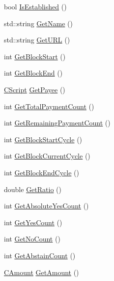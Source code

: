 \begin{DoxyCompactItemize}
\item 
bool \hyperlink{class_c_budget_proposal_a0f4231aa216c99a6a3ad2b6bf31d8bfe}{Is\+Established} ()
\item 
std\+::string \hyperlink{class_c_budget_proposal_a7f3bf6d86e4f4af03a45aa1c6d177af1}{Get\+Name} ()
\item 
std\+::string \hyperlink{class_c_budget_proposal_a4bddce62840e993e7351e68bfafca05d}{Get\+U\+R\+L} ()
\item 
int \hyperlink{class_c_budget_proposal_a711280cfc20e1d1a76a2b8c59dfe26ad}{Get\+Block\+Start} ()
\item 
int \hyperlink{class_c_budget_proposal_ad3e5e60c9fe53d7aef3314634eae54d7}{Get\+Block\+End} ()
\item 
\hyperlink{class_c_script}{C\+Script} \hyperlink{class_c_budget_proposal_a5489ea6b1dd54e25c2a0a52ef67e71a1}{Get\+Payee} ()
\item 
int \hyperlink{class_c_budget_proposal_a54cc431d667a7dfa1e010d6ff17a40c4}{Get\+Total\+Payment\+Count} ()
\item 
int \hyperlink{class_c_budget_proposal_a1fef390cf24f7f110c375ab6e7d01f50}{Get\+Remaining\+Payment\+Count} ()
\item 
int \hyperlink{class_c_budget_proposal_a66de6699a9cc9b084eecf014a168bab8}{Get\+Block\+Start\+Cycle} ()
\item 
int \hyperlink{class_c_budget_proposal_a33ad377cb08046ac197041fb6a06df6e}{Get\+Block\+Current\+Cycle} ()
\item 
int \hyperlink{class_c_budget_proposal_afe85ba7619fe2bf636e063550769a006}{Get\+Block\+End\+Cycle} ()
\item 
double \hyperlink{class_c_budget_proposal_aef844b5ab211003e6b93bef75a20da6e}{Get\+Ratio} ()
\item 
int \hyperlink{class_c_budget_proposal_ac3533cb49bad2a16caff3a1f5a5a7642}{Get\+Absolute\+Yes\+Count} ()
\item 
int \hyperlink{class_c_budget_proposal_adfb1010987096898eb4e820440877442}{Get\+Yes\+Count} ()
\item 
int \hyperlink{class_c_budget_proposal_abff824751942908b6babccd221911399}{Get\+No\+Count} ()
\item 
int \hyperlink{class_c_budget_proposal_a263871755bfaa3fe611655377b9d020e}{Get\+Abstain\+Count} ()
\item 
\hyperlink{amount_8h_a4eaf3a5239714d8c45b851527f7cb564}{C\+Amount} \hyperlink{class_c_budget_proposal_a2053aad4bd3c03675edf6f1ae60fff39}{Get\+Amount} ()
\item 

\end{DoxyCompactItemize}
